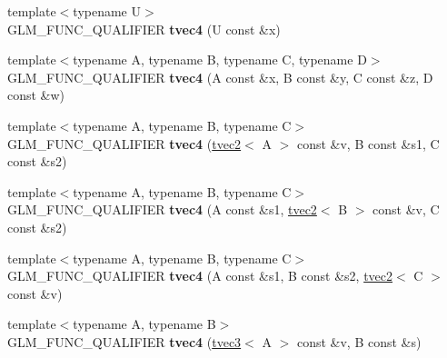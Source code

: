 \begin{DoxyCompactItemize}
\item 
\hypertarget{structglm_1_1detail_1_1tvec4_aaf3a0ae60f53a7abbf398639d0cd9229}{}{\footnotesize template$<$typename U$>$ }\\G\+L\+M\+\_\+\+F\+U\+N\+C\+\_\+\+Q\+U\+A\+L\+I\+F\+I\+E\+R {\bfseries tvec4} (U const \&x)\label{structglm_1_1detail_1_1tvec4_aaf3a0ae60f53a7abbf398639d0cd9229}

\item 
\hypertarget{structglm_1_1detail_1_1tvec4_a0ef0de76de875005e8c18f1c8202ce13}{}{\footnotesize template$<$typename A, typename B, typename C, typename D$>$ }\\G\+L\+M\+\_\+\+F\+U\+N\+C\+\_\+\+Q\+U\+A\+L\+I\+F\+I\+E\+R {\bfseries tvec4} (A const \&x, B const \&y, C const \&z, D const \&w)\label{structglm_1_1detail_1_1tvec4_a0ef0de76de875005e8c18f1c8202ce13}

\item 
\hypertarget{structglm_1_1detail_1_1tvec4_a8672008b9295d2b6ecb4da23dec10afd}{}{\footnotesize template$<$typename A, typename B, typename C$>$ }\\G\+L\+M\+\_\+\+F\+U\+N\+C\+\_\+\+Q\+U\+A\+L\+I\+F\+I\+E\+R {\bfseries tvec4} (\hyperlink{structglm_1_1detail_1_1tvec2}{tvec2}$<$ A $>$ const \&v, B const \&s1, C const \&s2)\label{structglm_1_1detail_1_1tvec4_a8672008b9295d2b6ecb4da23dec10afd}

\item 
\hypertarget{structglm_1_1detail_1_1tvec4_a44561621356875a7dc541c2fee63aed4}{}{\footnotesize template$<$typename A, typename B, typename C$>$ }\\G\+L\+M\+\_\+\+F\+U\+N\+C\+\_\+\+Q\+U\+A\+L\+I\+F\+I\+E\+R {\bfseries tvec4} (A const \&s1, \hyperlink{structglm_1_1detail_1_1tvec2}{tvec2}$<$ B $>$ const \&v, C const \&s2)\label{structglm_1_1detail_1_1tvec4_a44561621356875a7dc541c2fee63aed4}

\item 
\hypertarget{structglm_1_1detail_1_1tvec4_ad3e23fa699ae4e8128aeb55ada3f7c63}{}{\footnotesize template$<$typename A, typename B, typename C$>$ }\\G\+L\+M\+\_\+\+F\+U\+N\+C\+\_\+\+Q\+U\+A\+L\+I\+F\+I\+E\+R {\bfseries tvec4} (A const \&s1, B const \&s2, \hyperlink{structglm_1_1detail_1_1tvec2}{tvec2}$<$ C $>$ const \&v)\label{structglm_1_1detail_1_1tvec4_ad3e23fa699ae4e8128aeb55ada3f7c63}

\item 
\hypertarget{structglm_1_1detail_1_1tvec4_a7e72b31ab75609668d91bc9c5b7cf28d}{}{\footnotesize template$<$typename A, typename B$>$ }\\G\+L\+M\+\_\+\+F\+U\+N\+C\+\_\+\+Q\+U\+A\+L\+I\+F\+I\+E\+R {\bfseries tvec4} (\hyperlink{structglm_1_1detail_1_1tvec3}{tvec3}$<$ A $>$ const \&v, B const \&s)\label{structglm_1_1detail_1_1tvec4_a7e72b31ab75609668d91bc9c5b7cf28d}


\end{DoxyCompactItemize}

